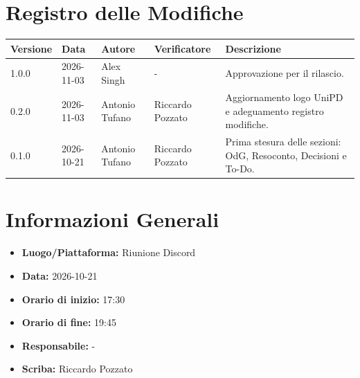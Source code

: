 \documentclass[a4paper, 11pt]{article}
\begin{document}
\section*{Registro delle Modifiche}
\vspace{0.5cm}
\begin{center}
\renewcommand{\arraystretch}{1.5}
\begin{tabularx}{\textwidth}{|l|l|l|l|X|}
\hline
\textbf{Versione} & \textbf{Data} & \textbf{Autore} & \textbf{Verificatore} & \textbf{Descrizione} \\ \hline
1.0.0 & 2026-11-03 & Alex Singh & - & Approvazione per il rilascio. \\ \hline
0.2.0 & 2026-11-03 & Antonio Tufano & Riccardo Pozzato & Aggiornamento logo UniPD e adeguamento registro modifiche. \\ \hline
0.1.0 & 2026-10-21 & Antonio Tufano & Riccardo Pozzato & Prima stesura delle sezioni: OdG, Resoconto, Decisioni e To-Do. \\ \hline

\end{tabularx}
\end{center}

\newpage

\tableofcontents
\newpage
\section{Informazioni Generali}
\begin{itemize}
    \item \textbf{Luogo/Piattaforma:} Riunione Discord
    \item \textbf{Data:} 2026-10-21
    \item \textbf{Orario di inizio:} 17:30
    \item \textbf{Orario di fine:} 19:45
    \item \textbf{Responsabile:} -
    \item \textbf{Scriba:} Riccardo Pozzato
\end{itemize}
\end{document}
